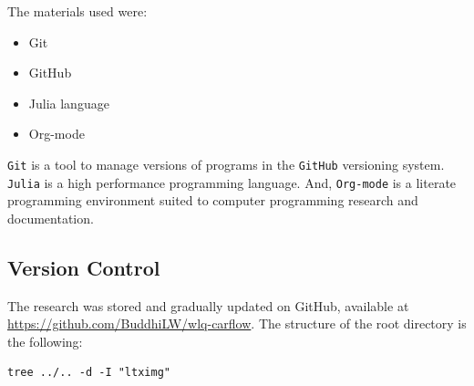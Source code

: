 \documentclass[11pt]{article}
\begin{document}
The materials used were:
\begin{itemize}
\item Git
\item GitHub
\item Julia language
\item Org-mode
\end{itemize}

\texttt{Git} is a tool to manage versions of programs in the \texttt{GitHub} versioning
system. \texttt{Julia} is a high performance programming language. And, \texttt{Org-mode} is a
literate programming environment suited to computer programming research and
documentation.

\subsection{Version Control}
\label{sec:org01be186}
The research was stored and gradually updated on GitHub, available at \url{https://github.com/BuddhiLW/wlq-carflow}. The structure of the root directory is the following:

\begin{verbatim}
tree ../.. -d -I "ltximg"
\end{verbatim}
\end{document}
